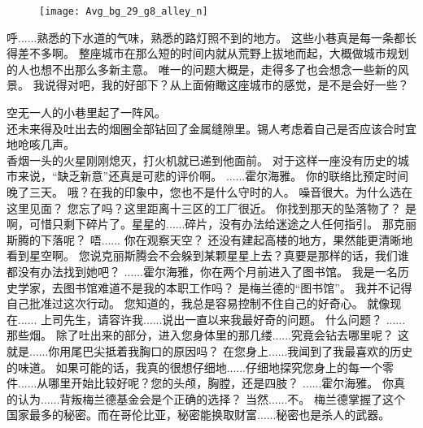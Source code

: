 \documentclass[openany]{book}
\begin{document}
\begin{figure}[h]
    \centering
    \texttt{[image: Avg\_bg\_29\_g8\_alley\_n]}
\end{figure}
\begin{dialogue}
     呼......熟悉的下水道的气味，熟悉的路灯照不到的地方。
     这些小巷真是每一条都长得差不多啊。
     整座城市在那么短的时间内就从荒野上拔地而起，大概做城市规划的人也想不出那么多新主意。
     唯一的问题大概是，走得多了也会想念一些新的风景。
     我说得对吧，我的好部下？从上面俯瞰这座城市的感觉，是不是会好一些？\par
    空无一人的小巷里起了一阵风。\\
    还未来得及吐出去的烟圈全部钻回了金属缝隙里。锡人考虑着自己是否应该合时宜地呛咳几声。\\
    香烟一头的火星刚刚熄灭，打火机就已递到他面前。
     对于这样一座没有历史的城市来说，“缺乏新意”还真是可悲的评价啊。
     ......霍尔海雅。
     你的联络比预定时间晚了三天。
     哦？在我的印象中，您也不是什么守时的人。
     噪音很大。为什么选在这里见面？
     您忘了吗？这里距离十三区的工厂很近。
     你找到那天的坠落物了？
     是啊，可惜只剩下碎片了。星星的......碎片，没有办法给迷途之人任何指引。
     那克丽斯腾的下落呢？
     唔......
     你在观察天空？
     还没有建起高楼的地方，果然能更清晰地看到星空啊。
     您说克丽斯腾会不会躲到某颗星星上去？真要是那样的话，我们谁都没有办法找到她吧？
     ......霍尔海雅，你在两个月前进入了图书馆。
     我是一名历史学家，去图书馆难道不是我的本职工作吗？
     是梅兰德的“图书馆”。
     我并不记得自己批准过这次行动。
     您知道的，我总是容易控制不住自己的好奇心。
     就像现在......
     上司先生，请容许我......说出一直以来我最好奇的问题。
     什么问题？
     ......那些烟。
     除了吐出来的部分，进入您身体里的那几缕......究竟会钻去哪里呢？
     这就是......你用尾巴尖抵着我胸口的原因吗？
     在您身上......我闻到了我最喜欢的历史的味道。
     如果可能的话，我真的很想仔细地......仔细地探究您身上的每一个零件......从哪里开始比较好呢？您的头颅，胸膛，还是四肢？
     ......霍尔海雅。
     你真的认为......背叛梅兰德基金会是个正确的选择？
     当然......不。
     梅兰德掌握了这个国家最多的秘密。而在哥伦比亚，秘密能换取财富......秘密也是杀人的武器。

\end{dialogue}
\end{document}
